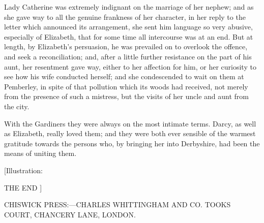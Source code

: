 \documentclass[12pt]{book}
\begin{document}
Lady Catherine was extremely indignant on the marriage of her nephew; and as she gave way to all the genuine frankness of her character, in her reply to the letter which announced its arrangement, she sent him language so very abusive, especially of Elizabeth, that for some time all intercourse was at an end. But at length, by Elizabeth's persuasion, he was prevailed on to overlook the offence, and seek a reconciliation; and, after a little further resistance on the part of his aunt, her resentment gave way, either to her affection for him, or her curiosity to see how his wife conducted herself; and she condescended to wait on them at Pemberley, in spite of that pollution which its woods had received, not merely from the presence of such a mistress, but the visits of her uncle and aunt from the city.

With the Gardiners they were always on the most intimate terms. Darcy, as well as Elizabeth, really loved them; and they were both ever sensible of the warmest gratitude towards the persons who, by bringing her into Derbyshire, had been the means of uniting them.

[Illustration:

THE END ]

CHISWICK PRESS:---CHARLES WHITTINGHAM AND CO. TOOKS COURT, CHANCERY LANE, LONDON.
\end{document}
